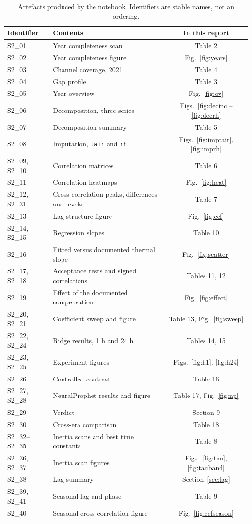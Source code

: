 \documentclass[11pt,a4paper]{article}
\begin{document}
\begin{table}[H]
\centering
\small
\caption{Artefacts produced by the notebook. Identifiers are stable names, not an
ordering.}
\begin{tabular}{@{}l L{9.2cm} c@{}}
\toprule
\textbf{Identifier} & \textbf{Contents} & \textbf{In this report}\\
\midrule
S2\_01 & Year completeness scan & Table 2\\
S2\_02 & Year completeness figure & Fig.~\ref{fig:years}\\
S2\_03 & Channel coverage, 2021 & Table 4\\
S2\_04 & Gap profile & Table 3\\
S2\_05 & Year overview & Fig.~\ref{fig:ov}\\
S2\_06 & Decomposition, three series & Figs.~\ref{fig:decinc}--\ref{fig:decrh}\\
S2\_07 & Decomposition summary & Table 5\\
S2\_08 & Imputation, \texttt{tair} and \texttt{rh} & Figs.~\ref{fig:imptair}, \ref{fig:imprh}\\
S2\_09, S2\_10 & Correlation matrices & Table 6\\
S2\_11 & Correlation heatmaps & Fig.~\ref{fig:heat}\\
S2\_12, S2\_31 & Cross-correlation peaks, differences and levels & Table 7\\
S2\_13 & Lag structure figure & Fig.~\ref{fig:ccf}\\
S2\_14, S2\_15 & Regression slopes & Table 10\\
S2\_16 & Fitted versus documented thermal slope & Fig.~\ref{fig:scatter}\\
S2\_17, S2\_18 & Acceptance tests and signed correlations & Tables 11, 12\\
S2\_19 & Effect of the documented compensation & Fig.~\ref{fig:effect}\\
S2\_20, S2\_21 & Coefficient sweep and figure & Table 13, Fig.~\ref{fig:sweep}\\
S2\_22, S2\_24 & Ridge results, 1 h and 24 h & Tables 14, 15\\
S2\_23, S2\_25 & Experiment figures & Figs.~\ref{fig:h1}, \ref{fig:h24}\\
S2\_26 & Controlled contrast & Table 16\\
S2\_27, S2\_28 & NeuralProphet results and figure & Table 17, Fig.~\ref{fig:np}\\
S2\_29 & Verdict & Section 9\\
S2\_30 & Cross-era comparison & Table 18\\
S2\_32--S2\_35 & Inertia scans and best time constants & Table 8\\
S2\_36, S2\_37 & Inertia scan figures & Figs.~\ref{fig:tau}, \ref{fig:tauband}\\
S2\_38 & Lag summary & Section~\ref{sec:lag}\\
S2\_39, S2\_41 & Seasonal lag and phase & Table 9\\
S2\_40 & Seasonal cross-correlation figure & Fig.~\ref{fig:ccfseason}\\
\bottomrule
\end{tabular}
\end{table}
\end{document}
